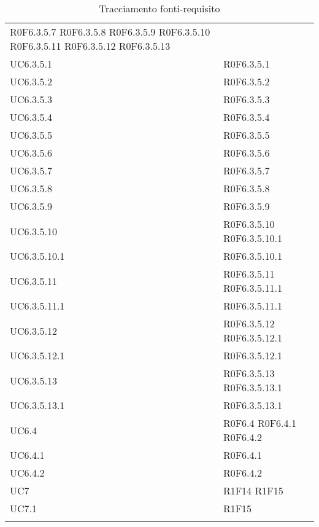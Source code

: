 \begin{longtable}{p{2.5cm}!{\VRule[1pt]}p{5.5cm}}
	\newline R0F6.3.5.7
	\newline R0F6.3.5.8
	\newline R0F6.3.5.9
	\newline R0F6.3.5.10
	\newline R0F6.3.5.11
	\newline R0F6.3.5.12
	\newline R0F6.3.5.13\\
UC6.3.5.1 & R0F6.3.5.1\\
UC6.3.5.2 & R0F6.3.5.2\\
UC6.3.5.3 & R0F6.3.5.3\\
UC6.3.5.4 & R0F6.3.5.4\\
UC6.3.5.5 & R0F6.3.5.5\\
UC6.3.5.6 & R0F6.3.5.6\\
UC6.3.5.7 & R0F6.3.5.7\\
UC6.3.5.8 & R0F6.3.5.8\\
UC6.3.5.9 & R0F6.3.5.9\\
UC6.3.5.10 & R0F6.3.5.10
	\newline R0F6.3.5.10.1\\
UC6.3.5.10.1 & R0F6.3.5.10.1\\
UC6.3.5.11 & R0F6.3.5.11
	\newline R0F6.3.5.11.1\\
UC6.3.5.11.1 & R0F6.3.5.11.1\\
UC6.3.5.12 & R0F6.3.5.12
	\newline R0F6.3.5.12.1\\
UC6.3.5.12.1 & R0F6.3.5.12.1\\
UC6.3.5.13 & R0F6.3.5.13
	\newline R0F6.3.5.13.1\\
UC6.3.5.13.1 & R0F6.3.5.13.1\\
UC6.4 & R0F6.4
	\newline R0F6.4.1
	\newline R0F6.4.2\\
UC6.4.1 & R0F6.4.1\\
UC6.4.2 & R0F6.4.2\\
UC7 & R1F14
	\newline R1F15\\
UC7.1 & R1F15\\

\caption{Tracciamento fonti-requisito}
\end{longtable}